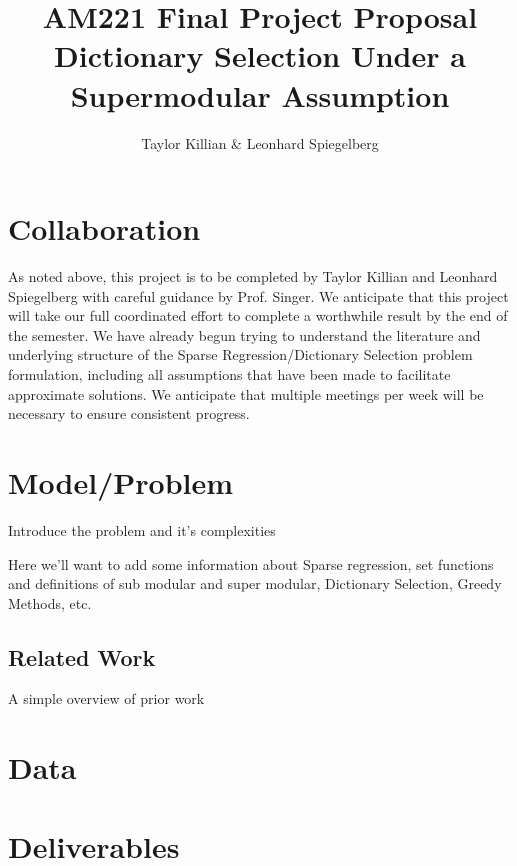 \documentclass{article}
\begin{document}
\title{AM221 Final Project Proposal \\ \large Dictionary Selection Under a Supermodular Assumption}
\author{Taylor Killian \& Leonhard Spiegelberg}
\maketitle

%

\section{Collaboration}\label{partnership}
As noted above, this project is to be completed by Taylor Killian and Leonhard Spiegelberg with careful guidance by Prof. Singer. We anticipate that this project will take our full coordinated effort to complete a worthwhile result by the end of the semester. We have already begun trying to understand the literature and underlying structure of the Sparse Regression/Dictionary Selection problem formulation, including all assumptions that have been made to facilitate approximate solutions. We anticipate that multiple meetings per week will be necessary to ensure consistent progress. 

\section{Model/Problem} \label{model}
Introduce the problem and it's complexities

Here we'll want to add some information about Sparse regression, set functions and definitions of sub modular and super modular, Dictionary Selection, Greedy Methods, etc.

\subsection{Related Work}
A simple overview of prior work

\section{Data}


\section{Deliverables} \label{methods}
\end{document}
